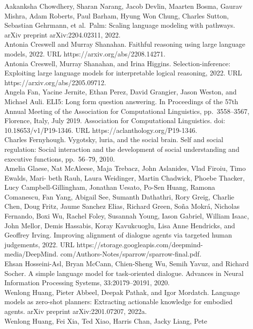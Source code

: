 \documentclass[
]{article}
\begin{document}
Aakanksha Chowdhery, Sharan Narang, Jacob Devlin, Maarten Bosma, Gaurav
Mishra, Adam Roberts, Paul Barham, Hyung Won Chung, Charles Sutton,
Sebastian Gehrmann, et al.~Palm: Scaling language modeling with
pathways. arXiv preprint arXiv:2204.02311, 2022.\\
Antonia Creswell and Murray Shanahan. Faithful reasoning using large
language models, 2022. URL https://arxiv.org/abs/2208.14271.\\
Antonia Creswell, Murray Shanahan, and Irina Higgins.
Selection-inference: Exploiting large language models for interpretable
logical reasoning, 2022. URL https://arxiv.org/abs/2205.09712.\\
Angela Fan, Yacine Jernite, Ethan Perez, David Grangier, Jason Weston,
and Michael Auli. ELI5: Long form question answering. In Proceedings of
the 57th Annual Meeting of the Association for Computational
Linguistics, pp.~3558--3567, Florence, Italy, July 2019. Association for
Computational Linguistics. doi: 10.18653/v1/P19-1346. URL
https://aclanthology.org/P19-1346.\\
Charles Fernyhough. Vygotsky, luria, and the social brain. Self and
social regulation: Social interaction and the development of social
understanding and executive functions, pp.~56--79, 2010.\\
Amelia Glaese, Nat McAleese, Maja Trebacz, John Aslanides, Vlad Firoiu,
Timo Ewalds, Mari- beth Rauh, Laura Weidinger, Martin Chadwick, Phoebe
Thacker, Lucy Campbell-Gillingham, Jonathan Uesato, Po-Sen Huang, Ramona
Comanescu, Fan Yang, Abigail See, Sumanth Dathathri, Rory Greig, Charlie
Chen, Doug Fritz, Jaume Sanchez Elias, Richard Green, Soña Mokrá,
Nicholas Fernando, Boxi Wu, Rachel Foley, Susannah Young, Iason Gabriel,
William Isaac, John Mellor, Demis Hassabis, Koray Kavukcuoglu, Lisa Anne
Hendricks, and Geoffrey Irving. Improving alignment of dialogue agents
via targeted human judgements, 2022. URL
https://storage.googleapis.com/deepmind-media/DeepMind.
com/Authors-Notes/sparrow/sparrow-final.pdf.\\
Ehsan Hosseini-Asl, Bryan McCann, Chien-Sheng Wu, Semih Yavuz, and
Richard Socher. A simple language model for task-oriented dialogue.
Advances in Neural Information Processing Systems, 33:20179--20191,
2020.\\
Wenlong Huang, Pieter Abbeel, Deepak Pathak, and Igor Mordatch. Language
models as zero-shot planners: Extracting actionable knowledge for
embodied agents. arXiv preprint arXiv:2201.07207, 2022a.\\
Wenlong Huang, Fei Xia, Ted Xiao, Harris Chan, Jacky Liang, Pete
\end{document}
